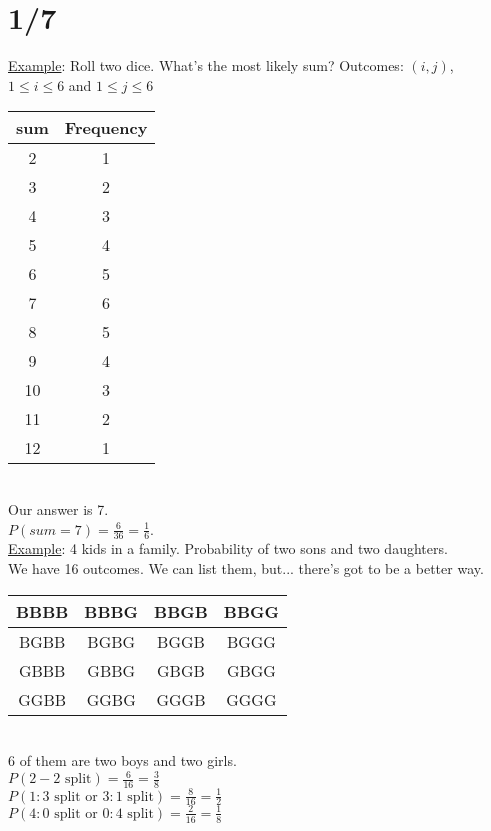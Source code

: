 \section*{1/7}
  \underline{Example}: Roll two dice. What's the most likely sum?
  Outcomes: $(i, j)$, $1 \le i \le 6$ and $1 \le j \le 6$
  \begin{tabular}{c | c}
    sum & Frequency\\
    \hline
    2 & 1\\
    3 & 2 \\
    4 & 3 \\
    5 & 4 \\
    6 & 5 \\
    7 & 6 \\
    8 & 5 \\
    9 & 4 \\
    10 & 3 \\
    11 & 2 \\
    12 & 1 \\
  \end{tabular}\\
  Our answer is 7. \\
  $P(sum = 7) = \frac{6}{36} = \frac{1}{6}$.\\
  \underline{Example}: 4 kids in a family. Probability of two sons and two 
  daughters.\\
  We have 16 outcomes. We can list them, but... there's got to be a better way.\\
  \begin{tabular}{|c | c | c | c|}
  \hline
  BBBB & BBBG & BBGB & BBGG\\
  \hline
  BGBB & BGBG & BGGB & BGGG\\
  \hline
  GBBB & GBBG & GBGB & GBGG\\
  \hline
  GGBB & GGBG & GGGB & GGGG\\
  \hline
  \end{tabular}\\
  6 of them are two boys and two girls.\\
  $P(2-2 \text{ split}) = \frac{6}{16} = \frac{3}{8}$\\
  $P(1:3 \text{ split or } 3:1 \text{ split}) = \frac{8}{16} = \frac{1}{2}$\\
  $P(4:0 \text{ split or } 0:4 \text{ split}) = \frac{2}{16} = \frac{1}{8}$\\
